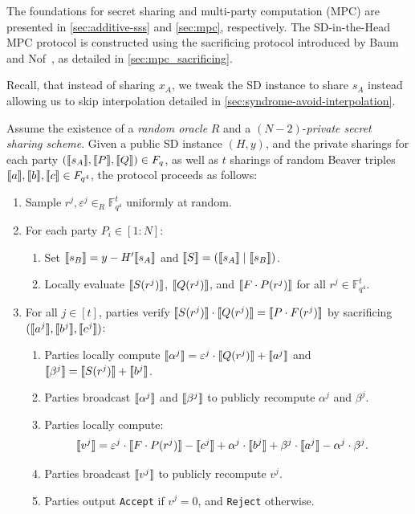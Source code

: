 \documentclass[11pt]{report}
\theoremstyle{definition}
\theoremstyle{plain}
\begin{document}
The foundations for secret sharing and multi-party computation (MPC) are presented in \autoref{sec:additive-sss} and \autoref{sec:mpc}, respectively. The SD-in-the-Head MPC protocol is constructed using the sacrificing protocol introduced by Baum and Nof~\cite{baum2020concretely}, as detailed in \autoref{sec:mpc_sacrificing}.

Recall, that instead of sharing $x_A$, we tweak the SD instance to share $s_A$ instead allowing us to skip interpolation detailed in \autoref{sec:syndrome-avoid-interpolation}.

\begin{protocol}\label{def:sdith-mpc}
  Assume the existence of a \textit{random oracle} $R$ and a $(N-2)$-\textit{private secret sharing scheme}. Given a public SD instance $(H, y)$, and the private sharings for each party $(\llbracket s_A \rrbracket, \llbracket P \rrbracket, \llbracket Q \rrbracket) \in F_q$, as well as $t$ sharings of random Beaver triples $\llbracket a \rrbracket, \llbracket b \rrbracket, \llbracket c \rrbracket \in F_{q^4}$, the protocol proceeds as follows:
  \begin{enumerate}
    \item Sample $r^j, \varepsilon^j \in_R \mathbb{F}_{q^4}^t$ uniformly at random.
    \item For each party $P_i \in [1 : N]$:
          \begin{enumerate}
            \item Set $\llbracket s_B \rrbracket = y - H' \llbracket s_A \rrbracket$ and $\llbracket S \rrbracket = (\llbracket s_A \rrbracket \mid \llbracket s_B \rrbracket)$.\label{step:sdith-mpc-lagrange-interpolation}
            \item Locally evaluate $\llbracket S(r^j) \rrbracket$, $\llbracket Q(r^j) \rrbracket$, and $\llbracket F \cdot P(r^j) \rrbracket$ for all $r^j \in \mathbb{F}_{q^4}^t$.
          \end{enumerate}
    \item For all $j \in [t]$, parties verify $\llbracket S(r^j) \rrbracket \cdot \llbracket Q(r^j) \rrbracket = \llbracket P \cdot F(r^j) \rrbracket$ by sacrificing \\$(\llbracket a^j \rrbracket, \llbracket b^j \rrbracket, \llbracket c^j \rrbracket)$:
          \begin{enumerate}[topsep=0pt]
            \item Parties locally compute $\llbracket \alpha^j \rrbracket  = \varepsilon^j \cdot \llbracket Q(r^j) \rrbracket + \llbracket a^j \rrbracket$ and $ \llbracket \beta^j \rrbracket  = \llbracket S(r^j) \rrbracket + \llbracket b^j \rrbracket$.
            \item Parties broadcast $\llbracket \alpha^j \rrbracket$ and $\llbracket \beta^j \rrbracket$ to publicly recompute $\alpha^j$ and $\beta^j$.
            \item Parties locally compute:
                  \begin{align*}
                    \llbracket v^j \rrbracket & = \varepsilon^j \cdot \llbracket F \cdot P(r^j) \rrbracket - \llbracket c^j \rrbracket + \alpha^j \cdot \llbracket b^j \rrbracket + \beta^j \cdot \llbracket a^j \rrbracket - \alpha^j \cdot \beta^j.
                  \end{align*}
            \item Parties broadcast $\llbracket v^j \rrbracket$ to publicly recompute $v^j$.
            \item Parties output \texttt{Accept} if $v^j = 0$, and \texttt{Reject} otherwise.
          \end{enumerate}
  \end{enumerate}
\end{protocol}
\end{document}
